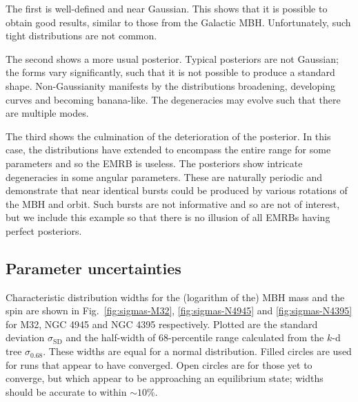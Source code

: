 \documentclass[useAMS,usedcolumn,usegraphicx,usenatbib]{mn2e}
\newcommand{\figref}[1]{Fig.~\ref{fig:#1}}
\newcommand{\sub}[1]{\ensuremath{_\mathrm{#1}}}
\begin{document}
The first is well-defined and near Gaussian. This shows that it is possible to obtain good results, similar to those from the Galactic MBH. Unfortunately, such tight distributions are not common.

The second shows a more usual posterior. Typical posteriors are not Gaussian; the forms vary significantly, such that it is not possible to produce a standard shape. Non-Gaussianity manifests by the distributions broadening, developing curves and becoming banana-like. The degeneracies may evolve such that there are multiple modes.

The third shows the culmination of the deterioration of the posterior. In this case, the distributions have extended to encompass the entire range for some parameters and so the EMRB is useless. The posteriors show intricate degeneracies in some angular parameters. These are naturally periodic and demonstrate that near identical bursts could be produced by various rotations of the MBH and orbit. Such bursts are not informative and so are not of interest, but we include this example so that there is no illusion of all EMRBs having perfect posteriors.

\subsection{Parameter uncertainties}

Characteristic distribution widths for the (logarithm of the) MBH mass and the spin are shown in \figref{sigmas-M32}, \ref{fig:sigmas-N4945} and \ref{fig:sigmas-N4395} for M32, NGC 4945 and NGC 4395 respectively. Plotted are the standard deviation $\sigma\sub{SD}$ and the half-width of 68-percentile range calculated from the $k$-d tree $\sigma_{0.68}$. These widths are equal for a normal distribution. Filled circles are used for runs that appear to have converged. Open circles are for those yet to converge, but which appear to be approaching an equilibrium state; widths should be accurate to within $\sim 10\%$.
\end{document}
